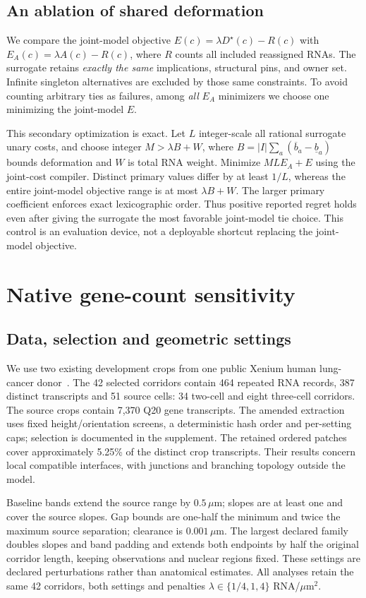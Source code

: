 \documentclass[10pt,letterpaper]{article}
\begin{document}
\subsection{An ablation of shared deformation}
We compare the joint-model objective $E(c)=\lambda D^\star(c)-R(c)$ with
$E_A(c)=\lambda A(c)-R(c)$, where $R$ counts all included reassigned RNAs. The surrogate retains \emph{exactly the same} implications, structural pins, and owner set. Infinite singleton alternatives are excluded by those same constraints. To avoid counting arbitrary ties as failures, among \emph{all} $E_A$ minimizers we choose one minimizing the joint-model $E$.

This secondary optimization is exact. Let $L$ integer-scale all rational surrogate unary costs, and choose integer $M>\lambda B+W$, where $B=|I|\sum_a(\overline b_a-\underline b_a)$ bounds deformation and $W$ is total RNA weight. Minimize $ML E_A+E$ using the joint-cost compiler. Distinct primary values differ by at least $1/L$, whereas the entire joint-model objective range is at most $\lambda B+W$. The larger primary coefficient enforces exact lexicographic order. Thus positive reported regret holds even after giving the surrogate the most favorable joint-model tie choice. This control is an evaluation device, not a deployable shortcut replacing the joint-model objective.

\section{Native gene-count sensitivity}\label{sec:native}
\subsection{Data, selection and geometric settings}
We use two existing development crops from one public Xenium human lung-cancer donor~\cite{data,xenium}. The 42 selected corridors contain 464 repeated RNA records, 387 distinct transcripts and 51 source cells: 34 two-cell and eight three-cell corridors. The source crops contain 7,370 Q20 gene transcripts. The amended extraction uses fixed height/orientation screens, a deterministic hash order and per-setting caps; selection is documented in the supplement. The retained ordered patches cover approximately 5.25\% of the distinct crop transcripts. Their results concern local compatible interfaces, with junctions and branching topology outside the model.

Baseline bands extend the source range by $0.5\,\mu$m; slopes are at least one and cover the source slopes. Gap bounds are one-half the minimum and twice the maximum source separation; clearance is $0.001\,\mu$m. The largest declared family doubles slopes and band padding and extends both endpoints by half the original corridor length, keeping observations and nuclear regions fixed. These settings are declared perturbations rather than anatomical estimates. All analyses retain the same 42 corridors, both settings and penalties $\lambda\in\{1/4,1,4\}$ RNA/$\mu$m$^2$.
\end{document}
